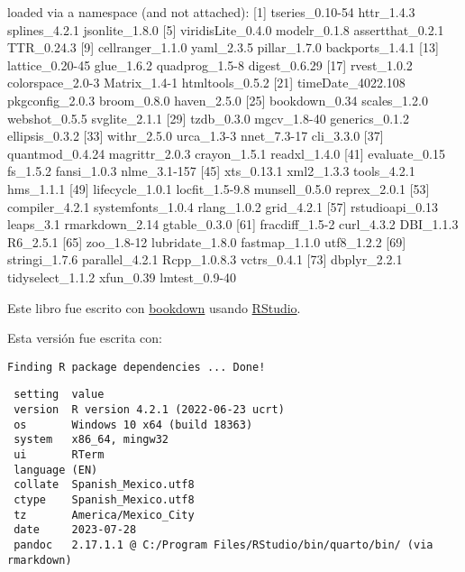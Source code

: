 \documentclass[
  a4paper,
  oneside,
  openany]{book}
\newenvironment{Shaded}{\begin{snugshade}}{\end{snugshade}}
\newcommand{\NormalTok}[1]{#1}
\begin{document}
\begin{Shaded}
\begin{Highlighting}[]
\NormalTok{loaded via a namespace (and not attached):}
\NormalTok{ [1] tseries\_0.10{-}54   httr\_1.4.3        splines\_4.2.1     jsonlite\_1.8.0   }
\NormalTok{ [5] viridisLite\_0.4.0 modelr\_0.1.8      assertthat\_0.2.1  TTR\_0.24.3       }
\NormalTok{ [9] cellranger\_1.1.0  yaml\_2.3.5        pillar\_1.7.0      backports\_1.4.1  }
\NormalTok{[13] lattice\_0.20{-}45   glue\_1.6.2        quadprog\_1.5{-}8    digest\_0.6.29    }
\NormalTok{[17] rvest\_1.0.2       colorspace\_2.0{-}3  Matrix\_1.4{-}1      htmltools\_0.5.2  }
\NormalTok{[21] timeDate\_4022.108 pkgconfig\_2.0.3   broom\_0.8.0       haven\_2.5.0      }
\NormalTok{[25] bookdown\_0.34     scales\_1.2.0      webshot\_0.5.5     svglite\_2.1.1    }
\NormalTok{[29] tzdb\_0.3.0        mgcv\_1.8{-}40       generics\_0.1.2    ellipsis\_0.3.2   }
\NormalTok{[33] withr\_2.5.0       urca\_1.3{-}3        nnet\_7.3{-}17       cli\_3.3.0        }
\NormalTok{[37] quantmod\_0.4.24   magrittr\_2.0.3    crayon\_1.5.1      readxl\_1.4.0     }
\NormalTok{[41] evaluate\_0.15     fs\_1.5.2          fansi\_1.0.3       nlme\_3.1{-}157     }
\NormalTok{[45] xts\_0.13.1        xml2\_1.3.3        tools\_4.2.1       hms\_1.1.1        }
\NormalTok{[49] lifecycle\_1.0.1   locfit\_1.5{-}9.8    munsell\_0.5.0     reprex\_2.0.1     }
\NormalTok{[53] compiler\_4.2.1    systemfonts\_1.0.4 rlang\_1.0.2       grid\_4.2.1       }
\NormalTok{[57] rstudioapi\_0.13   leaps\_3.1         rmarkdown\_2.14    gtable\_0.3.0     }
\NormalTok{[61] fracdiff\_1.5{-}2    curl\_4.3.2        DBI\_1.1.3         R6\_2.5.1         }
\NormalTok{[65] zoo\_1.8{-}12        lubridate\_1.8.0   fastmap\_1.1.0     utf8\_1.2.2       }
\NormalTok{[69] stringi\_1.7.6     parallel\_4.2.1    Rcpp\_1.0.8.3      vctrs\_0.4.1      }
\NormalTok{[73] dbplyr\_2.2.1      tidyselect\_1.1.2  xfun\_0.39         lmtest\_0.9{-}40    }
\end{Highlighting}
\end{Shaded}

Este libro fue escrito con \href{http://bookdown.org/}{bookdown} usando \href{http://www.rstudio.com/ide/}{RStudio}.

Esta versión fue escrita con:

\begin{verbatim}
Finding R package dependencies ... Done!
\end{verbatim}

\begin{verbatim}
 setting  value
 version  R version 4.2.1 (2022-06-23 ucrt)
 os       Windows 10 x64 (build 18363)
 system   x86_64, mingw32
 ui       RTerm
 language (EN)
 collate  Spanish_Mexico.utf8
 ctype    Spanish_Mexico.utf8
 tz       America/Mexico_City
 date     2023-07-28
 pandoc   2.17.1.1 @ C:/Program Files/RStudio/bin/quarto/bin/ (via rmarkdown)
\end{verbatim}
\end{document}
